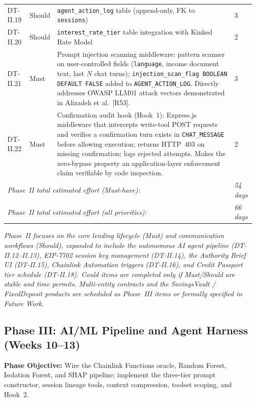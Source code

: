 \documentclass[12pt,a4paper]{report}
\begin{document}
\begin{table}[H]
\begin{tabular}{p{1.8cm}p{1.8cm}p{7.5cm}p{1.5cm}}
DT-II.19 & Should & \texttt{agent\_action\_log} table (append-only, FK to \texttt{sessions}) & 3 \\
DT-II.20 & Should & \texttt{interest\_rate\_tier} table integration with Kinked Rate Model & 2 \\
\hline
DT-II.21 & Must & Prompt injection scanning middleware: pattern scanner on user-controlled fields (\texttt{language}, income document text, last $N$ chat turns); \texttt{injection\_scan\_flag BOOLEAN DEFAULT FALSE} added to \texttt{AGENT\_ACTION\_LOG}. Directly addresses OWASP LLM01 attack vectors demonstrated in Alizadeh et al.~[R53]. & 3 \\
\hline
DT-II.22 & Must & Confirmation audit hook (Hook~1): Express.js middleware that intercepts write-tool POST requests and verifies a confirmation turn exists in \texttt{CHAT\_MESSAGE} before allowing execution; returns HTTP~403 on missing confirmation; logs rejected attempts. Makes the zero-bypass property an application-layer enforcement claim verifiable by code inspection. & 2 \\
\hline
\multicolumn{3}{l}{\textit{Phase~II total estimated effort (Must-have):}} & \textit{54 days} \\
\multicolumn{3}{l}{\textit{Phase~II total estimated effort (all priorities):}} & \textit{66 days} \\
\hline
\end{tabular}
\end{table}

\vspace{2pt}
\noindent\textit{\small Phase~II focuses on the core lending lifecycle (Must) and communication workflows (Should), expanded to include the autonomous AI agent pipeline (DT-II.12--II.13), EIP-7702 session key management (DT-II.14), the Authority Brief UI (DT-II.15), Chainlink Automation triggers (DT-II.16), and Credit Passport tier schedule (DT-II.18). Could items are completed only if Must/Should are stable and time permits. Multi-entity contracts and the SavingsVault / FixedDeposit products are scheduled as Phase~III items or formally specified in Future Work.}


\subsection{Phase III: AI/ML Pipeline and Agent Harness (Weeks 10--13)}

\textbf{Phase Objective:} Wire the Chainlink Functions oracle, Random Forest,
Isolation Forest, and SHAP pipeline; implement the three-tier prompt constructor,
session lineage tools, context compression, toolset scoping, and Hook~2.
\end{document}
